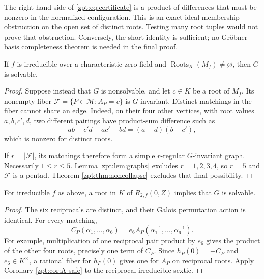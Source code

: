 \documentclass[11pt,letterpaper]{article}
\numberwithin{equation}{section}
\theoremstyle{definition}
\theoremstyle{remark}
\newcommand{\Rtwo}{R_{2,f}}
\newcommand{\tpoM}{\mathcal M}
\DeclareMathOperator{\Roots}{Roots}
\newcommand{\Ares}{M_f}\newcommand{\Tres}{T_f}
\newcommand{\roots}[1]{\Roots_K(#1)}
\begin{document}
\begin{remark}
The right-hand side of \eqref{zpt:eq:certificate} is a product of differences
that must be nonzero in the normalized configuration. This is an exact
ideal-membership obstruction on the open set of distinct roots. Testing
many root tuples would not prove that obstruction. Conversely, the short
identity is sufficient; no Gr\"obner-basis completeness theorem is needed
in the final proof.
\end{remark}

\begin{corollary}
\label{zpt:cor:A-safe}
If $f$ is irreducible over a characteristic-zero field and
$\roots{\Ares}\ne\varnothing$, then $G$ is solvable.
\end{corollary}
\begin{proof}
Suppose instead that $G$ is nonsolvable, and let $c\in K$ be a root of
$\Ares$. Its nonempty fiber
$\mathcal F=\{P\in\tpoM:A_P=c\}$ is $G$-invariant.
Distinct matchings in the fiber cannot share an edge. Indeed, on their
four other vertices, with root values $a,b,c',d$, two different pairings
have product-sum difference such as
\[
 ab+c'd-ac'-bd=(a-d)(b-c'),
\]
which is nonzero for distinct roots.

If $r=|\mathcal F|$, its matchings therefore form a simple $r$-regular
$G$-invariant graph. Necessarily $1\le r\le5$. Lemma \ref{zpt:lem:graphs}
excludes $r=1,2,3,4$, so $r=5$ and $\mathcal F$ is a pentad. Theorem
\ref{zpt:thm:noncollapse} excludes that final possibility.
\end{proof}

\begin{corollary}
\label{zpt:cor:zero}
For irreducible $f$ as above, a root in $K$ of $\Rtwo(0,Z)$ implies that
$G$ is solvable.
\end{corollary}
\begin{proof}
The six reciprocals are distinct, and their Galois permutation action is
identical. For every matching,
\begin{equation}
 C_P(\alpha_1,\ldots,\alpha_6)
 =e_6 A_P(\alpha_1^{-1},\ldots,\alpha_6^{-1}).\label{zpt:eq:reciprocal}
\end{equation}
For example, multiplication of one reciprocal pair product by $e_6$
gives the product of the other four roots, precisely one term of $C_P$.
Since $h_P(0)=-C_P$ and $e_6\in K^\times$, a rational fiber for
$h_P(0)$ gives one for $A_P$ on reciprocal roots. Apply Corollary
\ref{zpt:cor:A-safe} to the reciprocal irreducible sextic.
\end{proof}
\end{document}
